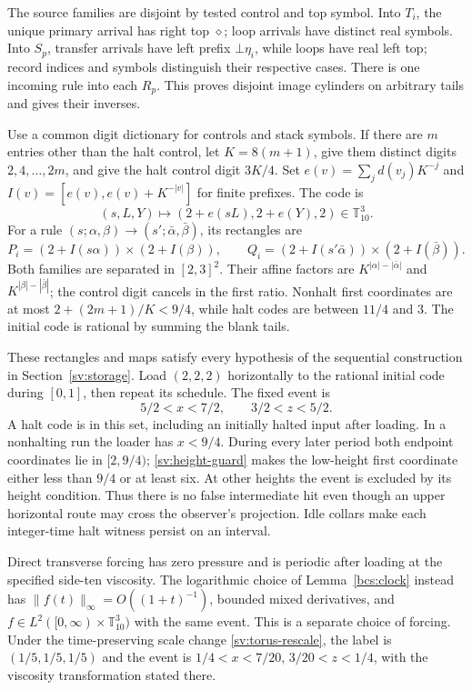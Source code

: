 The source families are disjoint by tested control and top symbol.
Into $T_i$, the unique primary arrival has right top $\diamond$;
loop arrivals have distinct real symbols.  Into $S_p$, transfer
arrivals have left prefix $\bot\eta_i$, while loops have real
left top; record indices and symbols distinguish their respective cases.
There is one incoming rule into each $R_p$.  This proves disjoint
image cylinders on arbitrary tails and gives their inverses.

Use a common digit dictionary for controls and stack symbols.  If there
are $m$ entries other than the halt control, let $K=8(m+1)$,
give them distinct digits $2,4,\ldots,2m$, and give the halt control
digit $3K/4$.  Set $e(v)=\sum_jd(v_j)K^{-j}$ and
$I(v)=[e(v),e(v)+K^{-|v|}]$ for finite prefixes.  The code is
\[
 (s,L,Y)\longmapsto (2+e(sL),2+e(Y),2)\in\mathbb T_{10}^3.
\]
For a rule $(s;\alpha,\beta)\to(s';\bar\alpha,\bar\beta)$,
its rectangles are
\[
 P_i=(2+I(s\alpha))\times(2+I(\beta)),\qquad
 Q_i=(2+I(s'\bar\alpha))\times(2+I(\bar\beta)).
\]
Both families are separated in $[2,3]^2$.  Their affine factors are
$K^{|\alpha|-|\bar\alpha|}$ and
$K^{|\beta|-|\bar\beta|}$; the control digit cancels in the
first ratio.  Nonhalt first coordinates are at most
$2+(2m+1)/K<9/4$, while halt codes are between $11/4$ and $3$.
The initial code is rational by summing the blank tails.

These rectangles and maps satisfy every hypothesis of the sequential
construction in Section~\ref{sv:storage}.  Load $(2,2,2)$ horizontally
to the rational initial code during $[0,1]$, then repeat its schedule.
The fixed event is
\[
 5/2<x<7/2,\qquad 3/2<z<5/2.
\]
A halt code is in this set, including an initially halted input after
loading.  In a nonhalting run the loader has $x<9/4$.  During every
later period both endpoint coordinates lie in $[2,9/4)$;
\eqref{sv:height-guard} makes the low-height first coordinate either
less than $9/4$ or at least six.  At other heights the event is
excluded by its height condition.  Thus there is no false intermediate
hit even though an upper horizontal route may cross the observer's
projection.  Idle collars make each integer-time halt witness persist
on an interval.

Direct transverse forcing has zero pressure and is periodic after loading
at the specified side-ten viscosity.  The logarithmic choice of
Lemma~\ref{bcs:clock} instead has
$\|f(t)\|_\infty=O((1+t)^{-1})$, bounded mixed derivatives,
and $f\in L^2([0,\infty)\times\mathbb T_{10}^3)$ with the
same event.  This is a separate choice of forcing.  Under the
time-preserving scale change \eqref{sv:torus-rescale}, the label is
$(1/5,1/5,1/5)$ and the event is
$1/4<x<7/20$, $3/20<z<1/4$, with the viscosity transformation
stated there.

